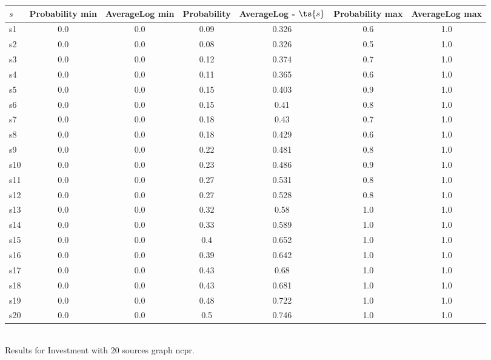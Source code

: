 \documentclass{article}
\begin{document}
\noindent\begin{tabular}{|l|c|c|c|c|c|c|}
\hline
$s$& Probability min & AverageLog min & Probability & AverageLog - $\ts{s}$ & Probability max & AverageLog max\\
\hline
s1 &0.0 & 0.0 & 0.09 & 0.326 & 0.6 & 1.0\\
\hline
s2 &0.0 & 0.0 & 0.08 & 0.326 & 0.5 & 1.0\\
\hline
s3 &0.0 & 0.0 & 0.12 & 0.374 & 0.7 & 1.0\\
\hline
s4 &0.0 & 0.0 & 0.11 & 0.365 & 0.6 & 1.0\\
\hline
s5 &0.0 & 0.0 & 0.15 & 0.403 & 0.9 & 1.0\\
\hline
s6 &0.0 & 0.0 & 0.15 & 0.41 & 0.8 & 1.0\\
\hline
s7 &0.0 & 0.0 & 0.18 & 0.43 & 0.7 & 1.0\\
\hline
s8 &0.0 & 0.0 & 0.18 & 0.429 & 0.6 & 1.0\\
\hline
s9 &0.0 & 0.0 & 0.22 & 0.481 & 0.8 & 1.0\\
\hline
s10 &0.0 & 0.0 & 0.23 & 0.486 & 0.9 & 1.0\\
\hline
s11 &0.0 & 0.0 & 0.27 & 0.531 & 0.8 & 1.0\\
\hline
s12 &0.0 & 0.0 & 0.27 & 0.528 & 0.8 & 1.0\\
\hline
s13 &0.0 & 0.0 & 0.32 & 0.58 & 1.0 & 1.0\\
\hline
s14 &0.0 & 0.0 & 0.33 & 0.589 & 1.0 & 1.0\\
\hline
s15 &0.0 & 0.0 & 0.4 & 0.652 & 1.0 & 1.0\\
\hline
s16 &0.0 & 0.0 & 0.39 & 0.642 & 1.0 & 1.0\\
\hline
s17 &0.0 & 0.0 & 0.43 & 0.68 & 1.0 & 1.0\\
\hline
s18 &0.0 & 0.0 & 0.43 & 0.681 & 1.0 & 1.0\\
\hline
s19 &0.0 & 0.0 & 0.48 & 0.722 & 1.0 & 1.0\\
\hline
s20 &0.0 & 0.0 & 0.5 & 0.746 & 1.0 & 1.0\\
\hline
\end{tabular}\\

\noindent Results for Investment with 20 sources graph ncpr.
\end{document}
